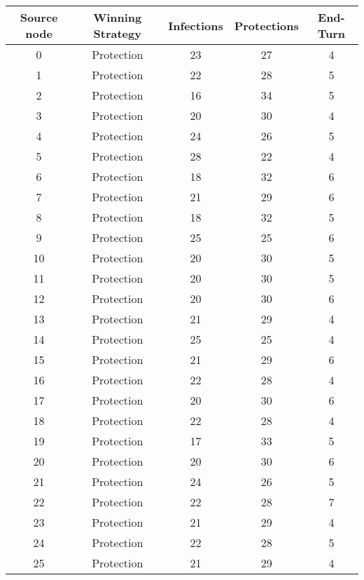 \documentclass[results.tex]{subfiles}
\begin{document}
\begin{center}
  \begin{tabular}{| c || c | c | c | c |}
    \hline
    {\bfseries Source node} & {\bfseries Winning Strategy} & {\bfseries Infections} & {\bfseries Protections} & {\bfseries End-Turn} \\  %
    \hline\hline
    0 & Protection & 23 & 27 & 4 \\ 
    \hline
    1 & Protection & 22 & 28 & 5 \\ 
    \hline
    2 & Protection & 16 & 34 & 5 \\ 
    \hline
    3 & Protection & 20 & 30 & 4 \\ 
    \hline
    4 & Protection & 24 & 26 & 5 \\ 
    \hline
    5 & Protection & 28 & 22 & 4 \\ 
    \hline
    6 & Protection & 18 & 32 & 6 \\ 
    \hline
    7 & Protection & 21 & 29 & 6 \\ 
    \hline
    8 & Protection & 18 & 32 & 5 \\ 
    \hline
    9 & Protection & 25 & 25 & 6 \\ 
    \hline
    10 & Protection & 20 & 30 & 5 \\ 
    \hline
    11 & Protection & 20 & 30 & 5 \\ 
    \hline
    12 & Protection & 20 & 30 & 6 \\ 
    \hline
    13 & Protection & 21 & 29 & 4 \\ 
    \hline
    14 & Protection & 25 & 25 & 4 \\ 
    \hline
    15 & Protection & 21 & 29 & 6 \\ 
    \hline
    16 & Protection & 22 & 28 & 4 \\ 
    \hline
    17 & Protection & 20 & 30 & 6 \\ 
    \hline
    18 & Protection & 22 & 28 & 4 \\ 
    \hline
    19 & Protection & 17 & 33 & 5 \\ 
    \hline
    20 & Protection & 20 & 30 & 6 \\ 
    \hline
    21 & Protection & 24 & 26 & 5 \\ 
    \hline
    22 & Protection & 22 & 28 & 7 \\ 
    \hline
    23 & Protection & 21 & 29 & 4 \\ 
    \hline
    24 & Protection & 22 & 28 & 5 \\ 
    \hline
    25 & Protection & 21 & 29 & 4 \\ 

\end{tabular}
\end{center}
\end{document}
